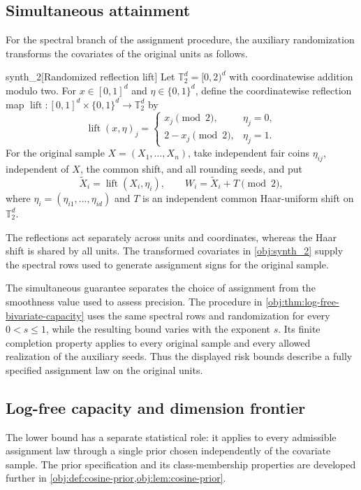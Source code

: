 \subsection{Simultaneous attainment}

For the spectral branch of the assignment procedure, the auxiliary randomization transforms the covariates of the original units as follows.

\begin{definitionv}{synth_2}[Randomized reflection lift]
Let \(\mathbb T_2^d=[0,2)^d\) with coordinatewise addition modulo two. For \(x\in[0,1]^d\) and \(\eta\in\{0,1\}^d\), define the coordinatewise reflection map \(\operatorname{lift}:[0,1]^d\times\{0,1\}^d\to\mathbb T_2^d\) by
\[
\operatorname{lift}(x,\eta)_j
=
\begin{cases}
x_j \pmod 2,&\eta_j=0,\\
2-x_j \pmod 2,&\eta_j=1.
\end{cases}
\]
For the original sample \(X=(X_1,\ldots,X_n)\), take independent fair coins \(\eta_{ij}\), independent of \(X\), the common shift, and all rounding seeds, and put
\[
\widetilde X_i=\operatorname{lift}(X_i,\eta_i),
\qquad
W_i=\widetilde X_i+T\pmod2,
\]
where \(\eta_i=(\eta_{i1},\ldots,\eta_{id})\) and \(T\) is an independent common Haar-uniform shift on \(\mathbb T_2^d\).
\end{definitionv}

The reflections act separately across units and coordinates, whereas the Haar shift is shared by all units. The transformed covariates in \cref{obj:synth_2} supply the spectral rows used to generate assignment signs for the original sample.

The simultaneous guarantee separates the choice of assignment from the smoothness value used to assess precision. The procedure in \cref{obj:thm:log-free-bivariate-capacity} uses the same spectral rows and randomization for every \(0<s\leq1\), while the resulting bound varies with the exponent \(s\). Its finite completion property applies to every original sample and every allowed realization of the auxiliary seeds. Thus the displayed risk bounds describe a fully specified assignment law on the original units.

\subsection{Log-free capacity and dimension frontier}

The lower bound has a separate statistical role: it applies to every admissible assignment law through a single prior chosen independently of the covariate sample. The prior specification and its class-membership properties are developed further in \cref{obj:def:cosine-prior,obj:lem:cosine-prior}.


